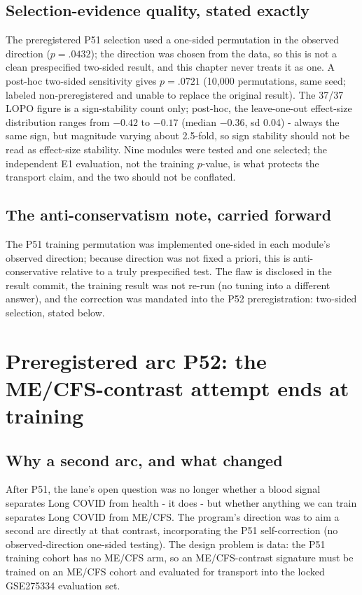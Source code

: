 \documentclass[11pt,a4paper]{article}
\begin{document}
\subsection{Selection-evidence quality, stated exactly}
The preregistered P51 selection used a one-sided permutation in the
observed direction ($p=.0432$); the direction was chosen from the data,
so this is not a clean prespecified two-sided result, and this chapter
never treats it as one. A post-hoc two-sided sensitivity gives
$p=.0721$ (10{,}000 permutations, same seed; labeled non-preregistered
and unable to replace the original result). The 37/37 LOPO figure is a
sign-stability count only; post-hoc, the leave-one-out effect-size
distribution ranges from $-0.42$ to $-0.17$ (median $-0.36$, sd 0.04) -
always the same sign, but magnitude varying about 2.5-fold, so sign
stability should not be read as effect-size stability. Nine modules were
tested and one selected; the independent E1 evaluation, not the training
$p$-value, is what protects the transport claim, and the two should not
be conflated.

\subsection{The anti-conservatism note, carried forward}
The P51 training permutation was implemented one-sided in each module's
observed direction; because direction was not fixed a priori, this is
anti-conservative relative to a truly prespecified test. The flaw is disclosed
in the result commit, the training result was not re-run (no tuning into a
different answer), and the correction was mandated into the P52
preregistration: two-sided selection, stated below.


\section{Preregistered arc P52: the ME/CFS-contrast attempt ends at training}
\subsection{Why a second arc, and what changed}
After P51, the lane's open question was no longer whether a blood signal
separates Long COVID from health - it does - but whether anything we can train
separates Long COVID from ME/CFS. The program's direction was to aim a second
arc directly at that contrast, incorporating the P51 self-correction (no
observed-direction one-sided testing). The design problem is data: the P51
training cohort has no ME/CFS arm, so an ME/CFS-contrast signature must be
trained on an ME/CFS cohort and evaluated for transport into the locked
GSE275334 evaluation set.
\end{document}
